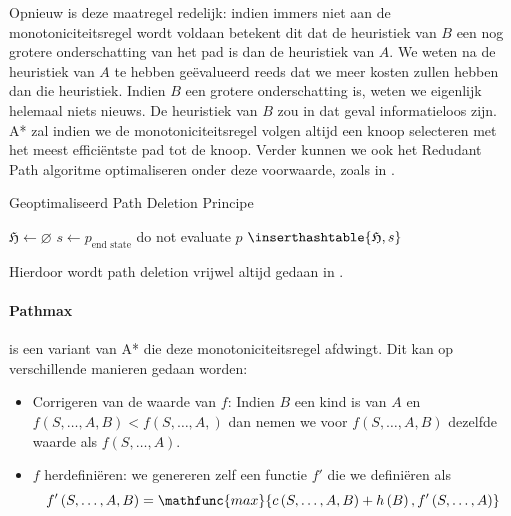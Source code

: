 Opnieuw is deze maatregel redelijk: indien immers niet aan de monotoniciteitsregel wordt voldaan betekent dit dat de heuristiek van $B$ een nog grotere onderschatting van het pad is dan de heuristiek van $A$. We weten na de heuristiek van $A$ te hebben ge\"evalueerd reeds dat we meer kosten zullen hebben dan die heuristiek. Indien $B$ een grotere onderschatting is, weten we eigenlijk helemaal niets nieuws. De heuristiek van $B$ zou in dat geval informatieloos zijn. A* zal indien we de monotoniciteitsregel volgen altijd een knoop selecteren met het meest effici\"entste pad tot de knoop. Verder kunnen we ook het Redudant Path algoritme optimaliseren onder deze voorwaarde, zoals in .
\begin{algorithm}[htb]
\caption{Geoptimaliseerd Path Deletion Principe}
\label{alg:optimalPathDeletion}
\begin{algorithmic}[1]
\STATE ${\mathfrak H}\leftarrow\varnothing$
\STATE $s\leftarrow p_{\mbox{end state}}$
\STATE do not evaluate $p$
\ELSE
\STATE $\inserthashtable{{\mathfrak H},s}$
\ENDIF
\ENDIF
\end{algorithmic}
\end{algorithm}
Hierdoor wordt path deletion vrijwel altijd gedaan in .
\paragraph{Pathmax}
 is een variant van A* die deze monotoniciteitsregel afdwingt. Dit kan op verschillende manieren gedaan worden:
\begin{itemize}
 \item Corrigeren van de waarde van $f$: Indien $B$ een kind is van $A$ en $f\left(S,\ldots,A,B\right)<f\left(S,\ldots,A,\right)$ dan nemen we voor $f\left(S,\ldots,A,B\right)$ dezelfde waarde als $f\left(S,\ldots,A\right)$.
 \item $f$ herdefini\"eren: we genereren zelf een functie $f'$ die we defini\"eren als
\begin{equation}
f'\left(S,\ldots,A,B\right)=\mathfunc{max}{c\left(S,\ldots,A,B\right)+h\left(B\right),f'\left(S,\ldots,A\right)}
\end{equation}
\end{itemize}
